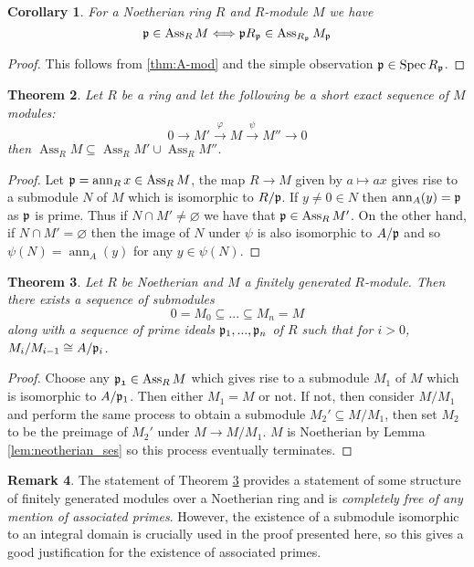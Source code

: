 \documentclass[12pt]{article}
\theoremstyle{plain}
\newtheorem{thm}{Theorem}[subsection] %
\newtheorem{cor}[thm]{Corollary}
\theoremstyle{definition}
\newtheorem{remark}[thm]{Remark}
\newcommand{\lto}{\longrightarrow}
\begin{document}
\begin{cor}
\label{cor:ass_R,ass_Rp}
For a Noetherian ring $R$ and $R$-module $M$ we have
\[\frak{p} \in \operatorname{Ass}_RM \Longleftrightarrow \frak{p}R_\frak{p} \in \operatorname{Ass}_{R_\frak{p}}M_{\frak{p}}\]
\end{cor}
\begin{proof}
This follows from \eqref{thm:A-mod} and the simple observation $\frak{p} \in \operatorname{Spec}R_{\frak{p}}$.
\end{proof}
\begin{thm}
\label{thm:shortexactsequence_ass}
Let $R$ be a ring and let the following be a short exact sequence of $M$ modules:
\[0 \lto M' \stackrel{\varphi}{\lto} M \stackrel{\psi}{\lto} M'' \lto 0\]
then $\operatorname{Ass}_RM \subseteq \operatorname{Ass}_RM' \cup \operatorname{Ass}_RM''$.
\end{thm}
\begin{proof}
Let $\frak{p} = \operatorname{ann}_Rx \in \operatorname{Ass}_RM$, the map $R \lto M$ given by $a \mapsto ax$ gives rise to a submodule $N$ of $M$ which is isomorphic to $R/\frak{p}$. If $y \neq 0 \in N$ then $\operatorname{ann}_A(y) = \frak{p}$ as $\frak{p}$ is prime. Thus if $N \cap M' \neq \varnothing$ we have that $\frak{p} \in \operatorname{Ass}_RM'$. On the other hand, if $N \cap M' = \varnothing$ then the image of $N$ under $\psi$ is also isomorphic to $A/\frak{p}$ and so $\psi(N) = \operatorname{ann}_A(y)$ for any $y \in \psi(N)$.
\end{proof}
\begin{thm}
\label{thm:sequence}
Let $R$ be Noetherian and $M$ a finitely generated $R$-module. Then there exists a sequence of submodules
\[0 = M_0 \subseteq ... \subseteq M_n = M\]
along with a sequence of prime ideals $\frak{p}_1,...,\frak{p}_n$ of $R$ such that for $i > 0$, $M_i/M_{i-1} \cong A/\frak{p}_i$.
\end{thm}
\begin{proof}
Choose any $\frak{p_1} \in \operatorname{Ass}_RM$ which gives rise to a submodule $M_1$ of $M$ which is isomorphic to $A/\frak{p}_1$. Then either $M_1 = M$ or not. If not, then consider $M/M_1$ and perform the same process to obtain a submodule $M_2' \subseteq M/M_1$, then set $M_2$ to be the preimage of $M_2'$ under $M \lto M/M_1$. $M$ is Noetherian by Lemma \ref{lem:neotherian_ses} so this process eventually terminates.
\end{proof}
\begin{remark}
The statement of Theorem \ref{thm:sequence} provides a statement of some structure of finitely generated modules over a Noetherian ring and is \emph{completely free of any mention of associated primes}. However, the existence of a submodule isomorphic to an integral domain is crucially used in the proof presented here, so this gives a good justification for the existence of associated primes.
\end{remark}
\end{document}
